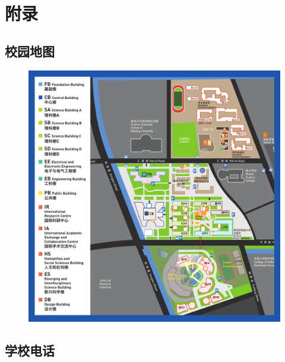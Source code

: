 \chapter{附录}
\label{sec.appendix}

\section{校园地图}
\begin{figure}[H]
    \includegraphics[width=\columnwidth]{author-folder/Kai.Wu/XJTLU-campus-map.pdf}
\end{figure}

\clearpage

\section{学校电话}

